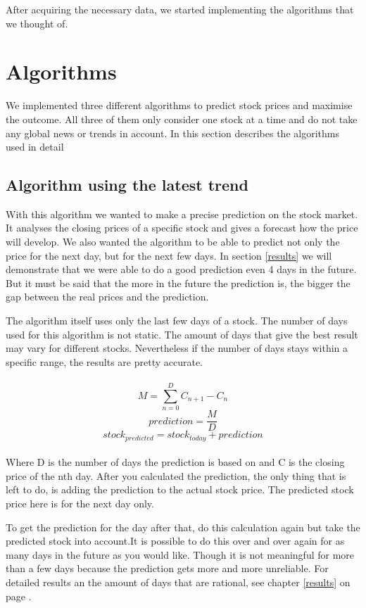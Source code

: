 \documentclass[conference]{IEEEtran}
\begin{document}
After acquiring the necessary data, we started implementing the algorithms that we thought of. 

\section{Algorithms}
\label{algorithm}

We implemented three different algorithms to predict stock prices and maximise the outcome. All three of them only consider one stock at a time and do not take any global news or trends in account. In this section describes the algorithms used in detail

\subsection{Algorithm using the latest trend}

With this algorithm we wanted to make a precise prediction on the stock market. It analyses the closing prices of a specific stock and gives a forecast how the price will develop. We also wanted the algorithm to be able to predict not only the price for the next day, but for the next few days. In section \ref{results} we will demonstrate that we were able to do a good prediction even 4 days in the future. But it must be said that the more in the future the prediction is, the bigger the gap between the real prices and the prediction.

The algorithm itself uses only the last few days of a stock. The number of days used for this algorithm is not static. The amount of days that give the best result may vary for different stocks. Nevertheless if the number of days stays within a specific range, the results are pretty accurate.
\\
\\
\[ M = \sum_{n=0}^D C_{n+1} - C_{n} \]
\[ prediction = \frac{M}{D}\]
\[ stock_{predicted} = stock_{today} + prediction\]
\\
Where D is the number of days the prediction is based on and C is the closing price of the nth day. After you calculated the prediction, the only thing that is left to do, is adding the prediction to the actual stock price. The predicted stock price here is for the next day only. 

To get the prediction for the day after that, do this calculation again but take the predicted stock into account.It is possible to do this over and over again for as many days in the future as you would like. Though it is not meaningful for more than a few days because the prediction gets more and more unreliable. For detailed results an the amount of days that are rational, see chapter \ref{results} on page 
\pageref{results}.
\end{document}

